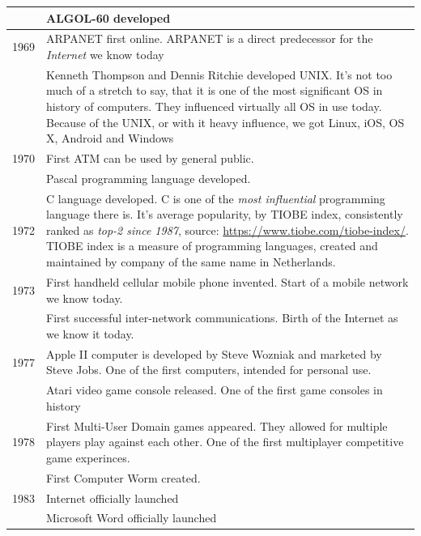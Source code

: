 \documentclass[../../what-is-computer]{subfiles}
\begin{document}
\begin{longtable}{p{}p{}}
        \cmidrule(r){2-2}
                & ALGOL-60 developed \\
        \midrule
        1969 & ARPANET first online. ARPANET is a direct predecessor for the \emph{Internet} we know today\\
        \cmidrule(r){2-2}
                & Kenneth Thompson and Dennis Ritchie developed UNIX. It's not too much of a stretch to say, that it is one of the most significant OS in history
                of computers. They influenced virtually all OS in use today. Because of the UNIX, or with it heavy influence, we got Linux, iOS, OS X, Android and Windows\\
        \midrule
        1970 & First ATM can be used by general public. \\
        \cmidrule(r){2-2}
                & Pascal programming language developed. \\
        \midrule
        1972 & C language developed. C is one of the \emph{most influential} programming language there is. It's average popularity, by 
        TIOBE index, consistently ranked as \emph{top-2 since 1987}, source: \href{https://www.tiobe.com/tiobe-index/}{https://www.tiobe.com/tiobe-index/}.
        TIOBE index is a measure of programming languages, created and maintained by company of the same name in Netherlands. \\
        \midrule
        1973 & First handheld cellular mobile phone invented. Start of a mobile network we know today. \\
        \cmidrule(r){2-2}
            & First successful inter-network communications. Birth of the Internet as we know it today. \\ 
        \midrule
        1977 & Apple II computer is developed by Steve Wozniak and marketed by Steve Jobs. One of the first computers, intended for personal use. \\
        \cmidrule(r){2-2}
            & Atari video game console released. One of the first game consoles in history\\
        \midrule
        1978 & First Multi-User Domain games appeared. They allowed for multiple players play against each other. One of the first multiplayer competitive game experinces.\\
        \cmidrule(r){2-2}
            & First Computer Worm created.\\
        \midrule
        1983 & Internet officially launched \\
        \cmidrule(r){2-2}
            & Microsoft Word officially launched \\

\end{longtable}
\end{document}
